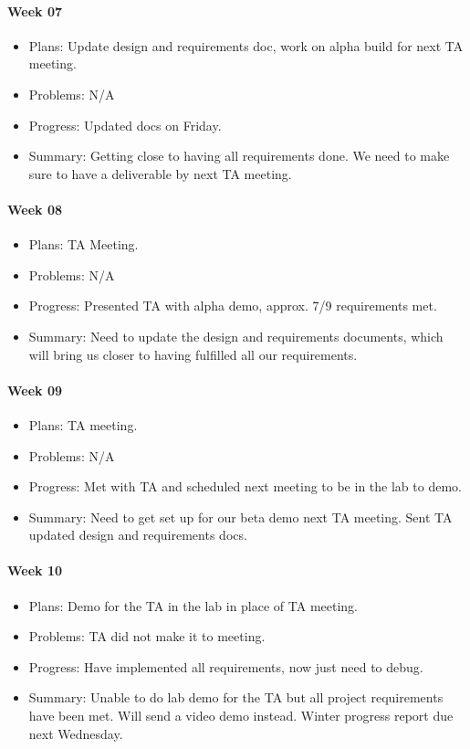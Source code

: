 \paragraph{Week 07}
\begin{itemize}
\item Plans: Update design and requirements doc, work on alpha build for next TA meeting.
\item Problems: N/A
\item Progress: Updated docs on Friday.
\item Summary: Getting close to having all requirements done. 
We need to make sure to have a deliverable by next TA meeting.
\end{itemize}
\paragraph{Week 08}
\begin{itemize}
\item Plans: TA Meeting.
\item Problems: N/A
\item Progress: Presented TA with alpha demo, approx. 7/9 requirements met.
\item Summary: Need to update the design and requirements documents, which will bring us closer to having fulfilled all our requirements.
\end{itemize}
\paragraph{Week 09}
\begin{itemize}
\item Plans: TA meeting.
\item Problems: N/A 
\item Progress: Met with TA and scheduled next meeting to be in the lab to demo.
\item Summary: Need to get set up for our beta demo next TA meeting. 
Sent TA updated design and requirements docs.
\end{itemize}
\paragraph{Week 10}
\begin{itemize}
\item Plans: Demo for the TA in the lab in place of TA meeting.
\item Problems: TA did not make it to meeting.
\item Progress: Have implemented all requirements, now just need to debug.
\item Summary: Unable to do lab demo for the TA but all project requirements have been met. 
Will send a video demo instead.
Winter progress report due next Wednesday.
\end{itemize}

